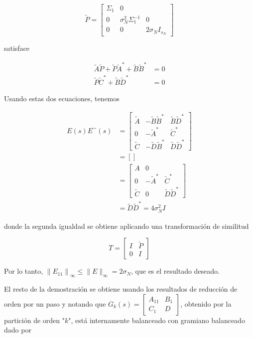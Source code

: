 $$
\tilde{P}=\left[\begin{array}{ccc}
\Sigma_{1} & 0 & \\
0 & \sigma_{N}^{2} \Sigma_{1}^{-1} & 0 \\
0 & 0 & 2 \sigma_{N} I_{s_{N}}
\end{array}\right]
$$

satisface

$$
\begin{aligned}
\tilde{A} \tilde{P}+\tilde{P} \tilde{A}^{*}+\tilde{B} \tilde{B}^{*} & =0 \\
\tilde{P} \tilde{C}^{*}+\tilde{B} \tilde{D}^{*} & =0
\end{aligned}
$$

Usando estas dos ecuaciones, tenemos

$$
\begin{aligned}
E(s) E^{\sim}(s) & =\left[\begin{array}{cc|c}
\tilde{A} & -\tilde{B} \tilde{B}^{*} & \tilde{B} \tilde{D}^{*} \\
0 & -\tilde{A}^{*} & \tilde{C}^{*} \\
\hline \tilde{C} & -\tilde{D} \tilde{B}^{*} & \tilde{D} \tilde{D}^{*}
\end{array}\right] \\
& =\left[\right] \\
& =\left[\begin{array}{cc|c}
A & 0 \\
0 & -\tilde{A}^{*} & \tilde{C}^{*} \\
\hline \tilde{C} & 0 & \tilde{D} \tilde{D}^{*}
\end{array}\right] \\
& =\tilde{D} \tilde{D}^{*}=4 \sigma_{N}^{2} I
\end{aligned}
$$

donde la segunda igualdad se obtiene aplicando una transformación de similitud

$$
T=\left[\begin{array}{cc}
I & \tilde{P} \\
0 & I
\end{array}\right]
$$

Por lo tanto, $\left\|E_{11}\right\|_{\infty} \leq\|E\|_{\infty}=2 \sigma_{N}$, que es el resultado deseado.

El resto de la demostración se obtiene usando los resultados de reducción de orden por un paso y notando que $G_{k}(s)=\left[\begin{array}{c|c}A_{11} & B_{1} \\ \hline C_{1} & D\end{array}\right]$, obtenido por la partición de orden "$k$", está internamente balanceado con gramiano balanceado dado por


